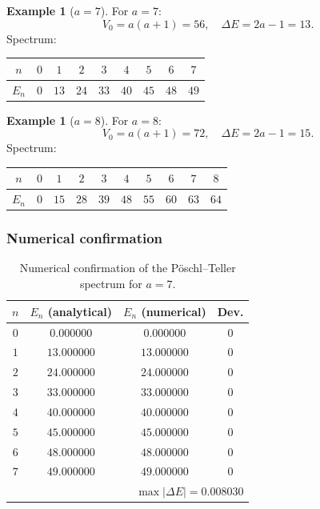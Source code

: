 \documentclass[11pt,a4paper]{article}
\theoremstyle{definition}
\newtheorem{example}[theorem]{Example}
\begin{document}
\begin{example}[$a = 7$]
For $a = 7$:
\begin{equation}
    V_0 = a(a+1) = 56, \quad
    \Delta E = 2a - 1 = 13.
\end{equation}
Spectrum:
\begin{center}
\begin{tabular}{c|cccccccc}
\toprule
$n$ & $0$ & $1$ & $2$ & $3$ & $4$ & $5$ & $6$ & $7$ \\
\midrule
$E_n$ & $0$ & $13$ & $24$ & $33$ & $40$ & $45$ & $48$ & $49$ \\
\bottomrule
\end{tabular}
\end{center}
\end{example}

\begin{example}[$a = 8$]
For $a = 8$:
\begin{equation}
    V_0 = a(a+1) = 72, \quad
    \Delta E = 2a - 1 = 15.
\end{equation}
Spectrum:
\begin{center}
\begin{tabular}{c|ccccccccc}
\toprule
$n$ & $0$ & $1$ & $2$ & $3$ & $4$ & $5$ & $6$ & $7$ & $8$ \\
\midrule
$E_n$ & $0$ & $15$ & $28$ & $39$ & $48$ & $55$ & $60$ & $63$ & $64$ \\
\bottomrule
\end{tabular}
\end{center}
\end{example}

\subsubsection{Numerical confirmation}

\begin{table}[ht]
\centering
\caption{Numerical confirmation of the P\"oschl--Teller spectrum for \texorpdfstring{$a = 7$}{a = 7}.}
\label{tab:membrane-numerical}
\begin{tabular}{cccc}
\toprule
$n$ & $E_n$ (analytical) & $E_n$ (numerical) & Dev. \\
\midrule
$0$ & $0.000000$ & $0.000000$ & $0$ \\
$1$ & $13.000000$ & $13.000000$ & $0$ \\
$2$ & $24.000000$ & $24.000000$ & $0$ \\
$3$ & $33.000000$ & $33.000000$ & $0$ \\
$4$ & $40.000000$ & $40.000000$ & $0$ \\
$5$ & $45.000000$ & $45.000000$ & $0$ \\
$6$ & $48.000000$ & $48.000000$ & $0$ \\
$7$ & $49.000000$ & $49.000000$ & $0$ \\
\midrule
\multicolumn{4}{r}{$\max|\Delta E| = 0.008030$} \\
\bottomrule
\end{tabular}
\end{table}
\end{document}
